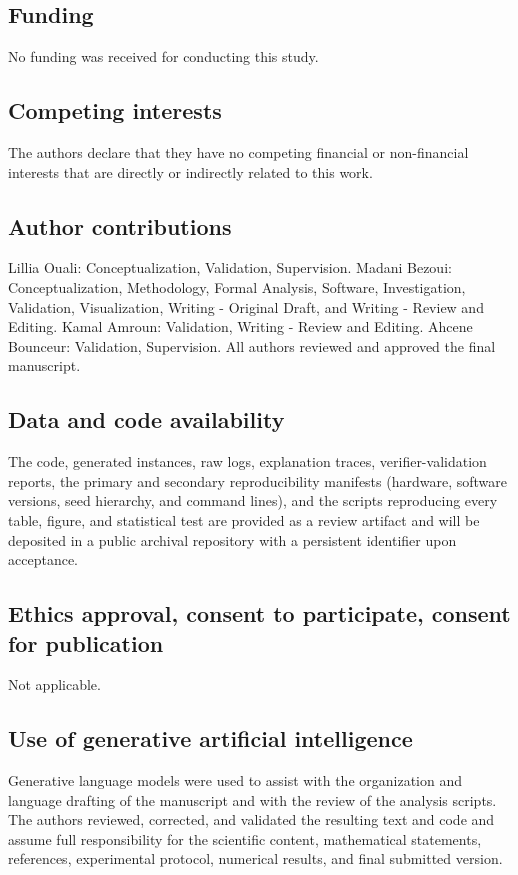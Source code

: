 \documentclass[pdflatex,sn-mathphys-num,iicol,oneside]{sn-jnl}
\begin{document}
\subsection*{Funding}

No funding was received for conducting this study.

\subsection*{Competing interests}

The authors declare that they have no competing financial or
non-financial interests that are directly or indirectly related to
this work.

\subsection*{Author contributions}

Lillia Ouali: Conceptualization, Validation, Supervision.
Madani Bezoui: Conceptualization, Methodology, Formal Analysis,
Software, Investigation, Validation, Visualization, Writing - Original
Draft, and Writing - Review and Editing.
Kamal Amroun: Validation, Writing - Review and Editing.
Ahcene Bounceur: Validation, Supervision.
All authors reviewed and approved the final manuscript.

\subsection*{Data and code availability}

The code, generated instances, raw logs, explanation traces,
verifier-validation reports, the primary and secondary reproducibility
manifests (hardware, software versions, seed hierarchy, and command
lines), and the scripts reproducing every table, figure, and
statistical test are provided as a review artifact and will be
deposited in a public archival repository with a persistent identifier
upon acceptance.

\subsection*{Ethics approval, consent to participate, consent for publication}

Not applicable.

\subsection*{Use of generative artificial intelligence}

Generative language models were used to assist with the organization
and language drafting of the manuscript and with the review of the
analysis scripts. The authors reviewed, corrected, and validated the
resulting text and code and assume full responsibility for the
scientific content, mathematical statements, references, experimental
protocol, numerical results, and final submitted version.


\end{document}
